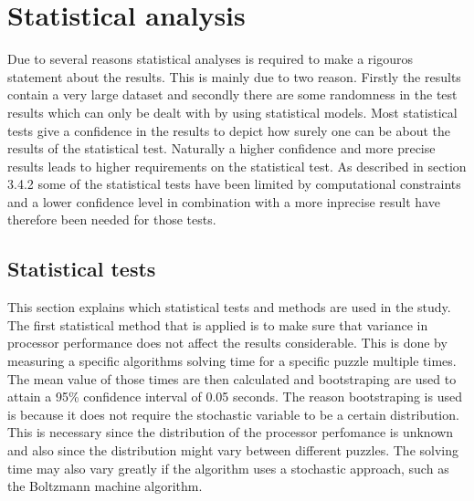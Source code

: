 \documentclass[a4paper,11pt]{kth-mag}
\begin{document}
\section{Statistical analysis}
\label{sec:statisticalAnalysis}
Due to several reasons statistical analyses is required to make a rigouros statement about the results. 
This is mainly due to two reason.
Firstly the results contain a very large dataset and secondly there are some randomness in the test results which can only be dealt with by using statistical models. 
Most statistical tests give a confidence in the results to depict how surely one can be about the results of the statistical test. Naturally a higher confidence and more precise results leads to higher requirements on the statistical test. As described in section 3.4.2 some of the statistical tests have been limited by computational constraints and a lower confidence level in combination with a more inprecise result have therefore been needed for those tests.

\FloatBarrier
\subsection{Statistical tests}
\label{sec:statisticalTests}
This section explains which statistical tests and methods are used in the study.
The first statistical method that is applied is to make sure that variance in processor performance does not affect the results considerable. 
This is done by measuring a specific algorithms solving time for a specific puzzle multiple times. 
The mean value of those times are then calculated and bootstraping are used to attain a 95\% confidence interval of 0.05 seconds. 
The reason bootstraping is used is because it does not require the stochastic variable to be a certain distribution. 
This is necessary since the distribution of the processor perfomance is unknown and also since the distribution might vary between different puzzles. The solving time may also vary greatly if the algorithm uses a stochastic approach, such as the Boltzmann machine algorithm.
\end{document}
